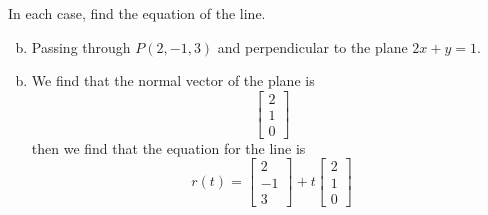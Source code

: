 \documentclass[../main.tex]{subfiles}
\begin{document}
In each case, find the equation of the line.
\begin{enumerate}[a)]
	\setcounter{enumi}{1}
	\item Passing through $P(2, -1, 3)$ and perpendicular to the plane $2x + y = 1$.
\end{enumerate}

\solution
\begin{enumerate}[a)]
	\setcounter{enumi}{1}
	\item We find that the normal vector of the plane is 
        \[ \begin{bmatrix}2\\1\\0\end{bmatrix} \]
        then we find that the equation for the line is
        \[ r(t) = \begin{bmatrix}2\\-1\\3\end{bmatrix} + t\begin{bmatrix}2\\1\\0\end{bmatrix} \]
\end{enumerate}
\end{document}
